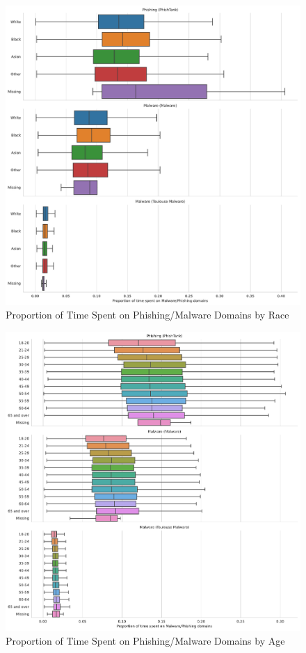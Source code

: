 \documentclass[12pt, letterpaper]{article}
\begin{document}
\begin{figure}[!htb]
	 \centering
	 \caption{Proportion of Time Spent on Phishing/Malware Domains by Race}
	 \label{fig:prop_total_time_phishing_malware_race}
	 \includegraphics[width=\textwidth]{../figs/prop_total_time_phishing_malware_tl_race.pdf}
\end{figure}

\begin{figure}[!htb]
	 \centering
	 \caption{Proportion of Time Spent on Phishing/Malware Domains by Age}
	 \label{prop_total_time_phishing_malware_age}
	 \includegraphics[width=\textwidth]{../figs/prop_total_time_phishing_malware_tl_age.pdf}
\end{figure}
\end{document}
